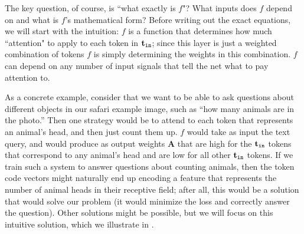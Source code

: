 The key question, of course, is ``what exactly is $f$"? What inputs does $f$ depend on and what is $f$'s mathematical form? Before writing out the exact equations, we will start with the intuition: $f$ is a function that determines how much ``attention" to apply to each token in $\mathbf{t}_{\texttt{in}}$; since this layer is just a weighted combination of tokens $f$ is simply determining the weights in this combination. $f$ can depend on any number of input signals that tell the net what to pay attention to.%

As a concrete example, consider that we want to be able to ask questions about different objects in our safari example image, such as ``how many animals are in the photo.'' Then one strategy would be to attend to each token that represents an animal's head, and then just count them up. $f$ would take as input the text query, and would produce as output weights $\mathbf{A}$ that are high for the $\mathbf{t}_{\texttt{in}}$ tokens that correspond to any animal's head and are low for all other $\mathbf{t}_{\texttt{in}}$ tokens. If we train such a system to answer questions about counting animals, then the token code vectors might naturally end up encoding a feature that represents the number of animal heads in their receptive field; after all, this would be a solution that would solve our problem (it would minimize the loss and correctly answer the question). Other solutions might be possible, but we will focus on this intuitive solution, which we illustrate in \fig{\ref{fig:transformers:attention_layer_safari_query_cartoon}}.


